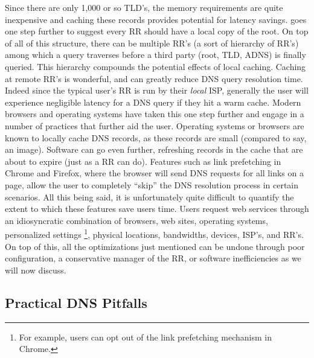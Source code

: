 \documentclass[sigconf,nonacm,10pt]{acmart}
\begin{document}
Since there are only 1,000 or so TLD's, the memory requirements are
quite inexpensive and caching these records provides potential for
latency savings. \cite{allman_eliminate} goes one step further to
suggest every RR should have a local copy of the root. \break
On top of all of this structure, there can be multiple RR's (a sort of
hierarchy of RR's) among which a query traverses before a third party
(root, TLD, ADNS) is finally queried. This hierarchy compounds the
potential effects of local caching. \break \break
Caching at remote RR's is wonderful, and can greatly reduce DNS query
resolution time. Indeed since the typical user's RR is run by their
\textit{local} ISP, generally the user will experience negligible
latency for a DNS query if they hit a warm cache. Modern browsers and
operating systems have taken this one step further and engage in a
number of practices that further aid the user. Operating systems or
browsers are known to locally cache DNS records, as these records are
small (compared to say, an image). Software can go even further,
refreshing records in the cache that are about to expire (just as a RR
can do). Features such as link prefetching in Chrome and Firefox, where
the browser will send DNS requests for all links on a page, allow the
user to completely ``skip'' the DNS resolution process in certain
scenarios. All this being said, it is unfortunately quite difficult to
quantify the extent to which these features save users time. Users
request web services through an idiosyncratic combination of browsers,
web sites, operating systems, personalized settings
\footnote{ For example, users can opt out of the link prefetching mechanism in Chrome. },
physical locations, bandwidths, devices, ISP's, and RR's. On top of
this, all the optimizations just mentioned can be undone through poor
configuration, a conservative manager of the RR, or software
inefficiencies as we will now discuss.

\subsection{Practical DNS Pitfalls}\label{practical-dns-pitfalls-1}
\end{document}
